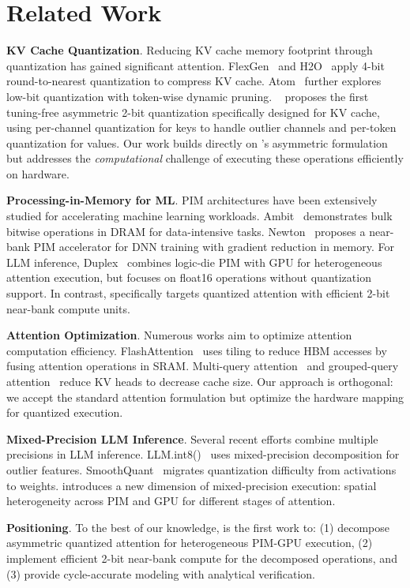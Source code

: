 \section{Related Work}
\label{sec:related}

\textbf{KV Cache Quantization}. Reducing KV cache memory footprint through quantization has gained significant attention.
FlexGen~\citep{flexgen} and H2O~\citep{h2o} apply 4-bit round-to-nearest quantization to compress KV cache.
Atom~\citep{zhao2024atom} further explores low-bit quantization with token-wise dynamic pruning.
\kivi{}~\citep{kivi} proposes the first tuning-free asymmetric 2-bit quantization specifically designed for KV cache, using per-channel quantization for keys to handle outlier channels and per-token quantization for values.
Our work builds directly on \kivi{}'s asymmetric formulation but addresses the \emph{computational} challenge of executing these operations efficiently on hardware.

\textbf{Processing-in-Memory for ML}. PIM architectures have been extensively studied for accelerating machine learning workloads.
Ambit~\citep{seshadri2017ambit} demonstrates bulk bitwise operations in DRAM for data-intensive tasks.
Newton~\citep{newton2021newton} proposes a near-bank PIM accelerator for DNN training with gradient reduction in memory.
For LLM inference, Duplex~\citep{duplex} combines logic-die PIM with GPU for heterogeneous attention execution, but focuses on float16 operations without quantization support.
In contrast, \pimattn{} specifically targets quantized attention with efficient 2-bit near-bank compute units.

\textbf{Attention Optimization}. Numerous works aim to optimize attention computation efficiency.
FlashAttention~\citep{dao2022flashattention} uses tiling to reduce HBM accesses by fusing attention operations in SRAM.
Multi-query attention~\citep{mqa} and grouped-query attention~\citep{gqa} reduce KV heads to decrease cache size.
Our approach is orthogonal: we accept the standard attention formulation but optimize the hardware mapping for quantized execution.

\textbf{Mixed-Precision LLM Inference}. Several recent efforts combine multiple precisions in LLM inference.
LLM.int8()~\citep{dettmers2022llmint8} uses mixed-precision decomposition for outlier features.
SmoothQuant~\citep{xiao2023smoothquant} migrates quantization difficulty from activations to weights.
\pimattn{} introduces a new dimension of mixed-precision execution: spatial heterogeneity across PIM and GPU for different stages of attention.

\textbf{Positioning}. To the best of our knowledge, \pimattn{} is the first work to:
(1) decompose asymmetric quantized attention for heterogeneous PIM-GPU execution, (2) implement efficient 2-bit near-bank compute for the decomposed operations, and (3) provide cycle-accurate modeling with analytical verification.
